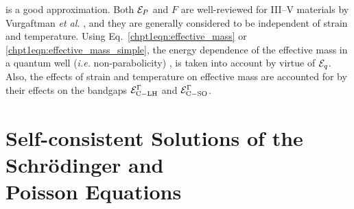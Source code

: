 {\begin{equation}
\end{equation}
is a good approximation.  Both $\EE_P$ and $F$ are well-reviewed for III--V materials by Vurgaftman \emph{et al.} \cite{Vurgaftman}, and they are generally considered to be independent of strain and temperature.  Using Eq.~\eqref{chpt1eqn:effective_mass} or \eqref{chpt1eqn:effective_mass_simple}, the energy dependence of the effective mass in a quantum well (\emph{i.e.} non-parabolicity) \cite{Sirtori:PRB:1994}, \cite{Nelson:PRB:1987} is taken into account by virtue of $\EE_q$.  Also, the effects of strain and temperature on effective mass are accounted for by their effects on the bandgaps $\EE_{\tn{C}-\tn{LH}}^\Gamma$ and $\EE_{\tn{C}-\tn{SO}}^\Gamma$.



\section[Self-consistent Solutions of the Schr\"{o}dinger and Poisson Equations]{Self-consistent Solutions of the Schr\"{o}dinger and \\ Poisson Equations}

}
